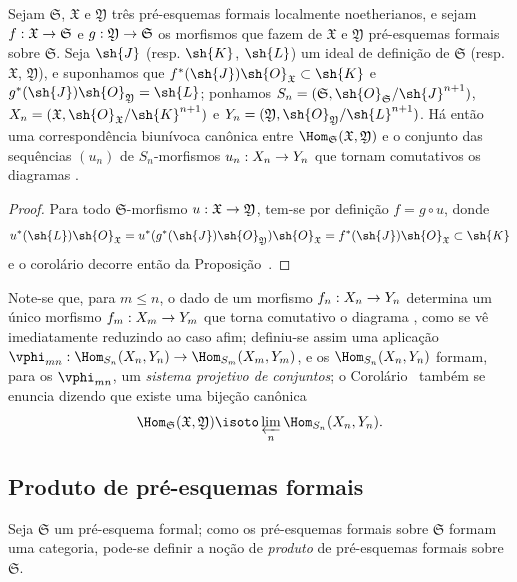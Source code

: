 \documentclass[oneside]{amsart}
\makeatletter
\renewcommand{\leq}{\leqslant}
\newcommand{\ega@arrow}[2]{\mathchoice{#1}{#2}{#2}{#2}}
\renewcommand{\to}{\ega@arrow{\longrightarrow}{\rightarrow}}
\newcommand{\oldpage}[2][]{{\marginnote{\normalfont\textbf{#1}~|~#2}}\ignorespaces}
\let\EGAOriginalLabel\label
\renewcommand{\label}[1]{\phantomsection\EGAOriginalLabel{#1}}
\makeatother
\begin{document}
\begin{corollary}[10.6.11]
\label{I.10.6.11}
Sejam $\mathfrak{S}$, $\mathfrak{X}$ e $\mathfrak{Y}$ três pré-esquemas formais localmente noetherianos, e sejam $f:\mathfrak{X}\to\mathfrak{S}$ e $g:\mathfrak{Y}\to\mathfrak{S}$ os morfismos que fazem de $\mathfrak{X}$ e $\mathfrak{Y}$ pré-esquemas formais sobre $\mathfrak{S}$.
Seja $\sh{J}$ (resp. $\sh{K}$, $\sh{L}$) um ideal de definição de $\mathfrak{S}$ (resp. $\mathfrak{X}$, $\mathfrak{Y}$), e suponhamos que $f^*(\sh{J})\sh{O}_\mathfrak{X}\subset\sh{K}$ e $g^*(\sh{J})\sh{O}_\mathfrak{Y}=\sh{L}$; ponhamos $S_n=(\mathfrak{S},\sh{O}_\mathfrak{S}/\sh{J}^{n+1})$, $X_n=(\mathfrak{X},\sh{O}_\mathfrak{X}/\sh{K}^{n+1})$ e $Y_n=(\mathfrak{Y},\sh{O}_\mathfrak{Y}/\sh{L}^{n+1})$.
Há então uma correspondência biunívoca canônica
\oldpage[I]{193}
entre $\Hom_\mathfrak{S}(\mathfrak{X},\mathfrak{Y})$ e o conjunto das sequências $(u_n)$ de $S_n$-morfismos $u_n:X_n\to Y_n$ que tornam comutativos os diagramas .
\end{corollary}

\begin{proof}
Para todo $\mathfrak{S}$-morfismo $u:\mathfrak{X}\to\mathfrak{Y}$, tem-se por definição $f=g\circ u$, donde
\[
  u^*(\sh{L})\sh{O}_\mathfrak{X}=u^*(g^*(\sh{J})\sh{O}_\mathfrak{Y})\sh{O}_\mathfrak{X}=f^*(\sh{J})\sh{O}_\mathfrak{X}\subset\sh{K}
\]
e o corolário decorre então da Proposição~.
\end{proof}

Note-se que, para $m\leq n$, o dado de um morfismo $f_n:X_n\to Y_n$ determina um único morfismo $f_m:X_m\to Y_m$ que torna comutativo o diagrama , como se vê imediatamente reduzindo ao caso afim; definiu-se assim uma aplicação $\vphi_{mn}:\Hom_{S_n}(X_n,Y_n)\to\Hom_{S_m}(X_m,Y_m)$, e os $\Hom_{S_n}(X_n,Y_n)$ formam, para os $\vphi_{mn}$, um \emph{sistema projetivo de conjuntos}; o Corolário~ também se enuncia dizendo que existe uma bijeção canônica
\[
  \Hom_\mathfrak{S}(\mathfrak{X},\mathfrak{Y})\isoto\varprojlim_n\Hom_{S_n}(X_n,Y_n).
\]

\subsection{Produto de pré-esquemas formais}
\label{subsection:I.10.7}

\begin{env}[10.7.1]
\label{I.10.7.1}
Seja $\mathfrak{S}$ um pré-esquema formal; como os pré-esquemas formais sobre $\mathfrak{S}$ formam uma categoria, pode-se definir a noção de \emph{produto} de pré-esquemas formais sobre $\mathfrak{S}$.
\end{env}
\end{document}
